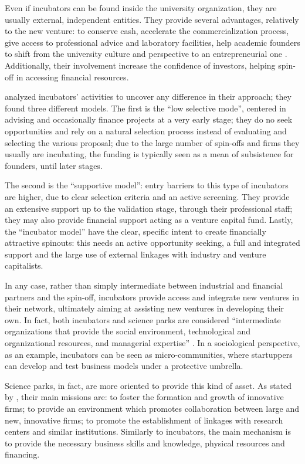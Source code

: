 Even if incubators can be found inside the university organization, they are usually external, independent entities. They provide several advantages, relatively to the new venture: to conserve cash, accelerate the commercialization process, give access to professional advice and laboratory facilities, help academic founders to shift from the university culture and perspective to an entrepreneurial one \citep{Ittelson2002}. Additionally, their involvement increase the confidence of investors, helping spin-off in accessing financial resources.

\citet{Clarysse2005} analyzed incubators' activities to uncover any difference in their approach; they found three different models. The first is the \enquote{low selective mode}, centered in advising and occasionally finance projects at a very early stage; they do no seek opportunities and rely on a natural selection process instead of evaluating and selecting the various proposal; due to the large number of spin-offs and firms they usually are incubating, the funding is typically seen as a mean of subsistence for founders, until later stages. 

The second is the \enquote{supportive model}: entry barriers to this type of incubators are higher, due to clear selection criteria and an active screening. They provide an extensive support up to the validation stage, through their professional staff; they may also provide financial support acting as a venture capital fund. Lastly, the \enquote{incubator model} have the clear, specific intent to create financially attractive spinouts: this needs an active opportunity seeking, a full and integrated support and the large use of external linkages with industry and venture capitalists.

In any case, rather than simply intermediate between industrial and financial partners and the spin-off, incubators provide access and integrate new ventures in their network, ultimately aiming at assisting new ventures in developing their own. In fact, both incubators and science parks are considered \enquote{intermediate organizations that provide the social environment, technological and organizational resources, and managerial expertise} \citep{Phan2005}. In a sociological perspective, as an example, incubators can be seen as micro-communities, where startuppers can develop and test business models under a protective umbrella. 

Science parks, in fact, are more oriented to provide this kind of asset. As stated by \citet{Siegel2003}, their main missions are: to foster the formation and growth of innovative firms; to provide an environment which promotes collaboration between large and new, innovative firms; to promote the establishment of linkages with research centers and similar institutions. Similarly to incubators, the main mechanism is to provide the necessary business skills and knowledge, physical resources and financing.

